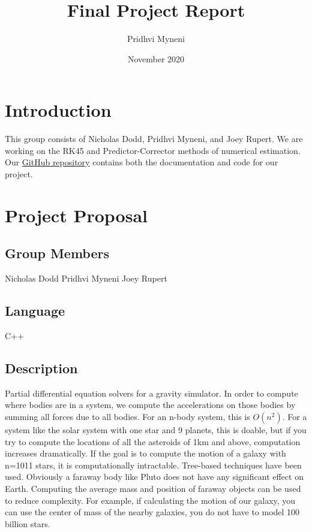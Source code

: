 \documentclass[12pt, letterpaper]{article}
\title{Final Project Report}
\author{Pridhvi Myneni }
\date{November 2020}
\begin{document}
\maketitle

\tableofcontents

\section{Introduction}
This group consists of Nicholas Dodd, Pridhvi Myneni, and Joey Rupert. We are working on the RK45 and Predictor-Corrector methods of numerical estimation. Our \href{https://github.com/PMARINA/CPE593-FinalProject}{GitHub repository}  contains both the documentation and code for our project. 

\section{Project Proposal}
\subsection{Group Members}
Nicholas Dodd
Pridhvi Myneni
Joey Rupert

\subsection{Language}
C++

\subsection{Description}

Partial differential equation solvers for a gravity simulator. In order to compute where bodies are in a system, we compute the accelerations on those bodies by summing all forces due to all bodies. For an n-body system, this is \(O(n^2)\). For a system like the solar system with one star and 9 planets, this is doable, but if you try to compute the locations of all the asteroids of 1km and above, computation increases dramatically. If the goal is to compute the motion of a galaxy with n=1011 stars, it is computationally intractable. Tree-based techniques have been used. Obviously a faraway body like Pluto does not have any significant effect on Earth. Computing the average mass and position of faraway objects can be used to reduce complexity. For example, if calculating the motion of our galaxy, you can use the center of mass of the nearby galaxies, you do not have to model 100 billion stars.
\end{document}
